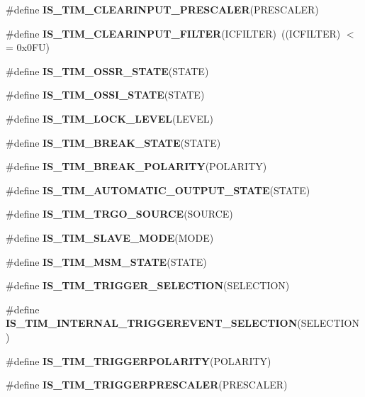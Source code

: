 \begin{DoxyCompactItemize}
\#define {\bfseries I\+S\+\_\+\+T\+I\+M\+\_\+\+C\+L\+E\+A\+R\+I\+N\+P\+U\+T\+\_\+\+P\+R\+E\+S\+C\+A\+L\+ER}(P\+R\+E\+S\+C\+A\+L\+ER)
\item 
\mbox{\label{group___t_i_m___i_s___t_i_m___definitions_gac46ddca5cf26c731771dc3bc3cb724e9}} 
\#define {\bfseries I\+S\+\_\+\+T\+I\+M\+\_\+\+C\+L\+E\+A\+R\+I\+N\+P\+U\+T\+\_\+\+F\+I\+L\+T\+ER}(I\+C\+F\+I\+L\+T\+ER)~((I\+C\+F\+I\+L\+T\+ER) $<$= 0x0\+F\+U)
\item 
\#define {\bfseries I\+S\+\_\+\+T\+I\+M\+\_\+\+O\+S\+S\+R\+\_\+\+S\+T\+A\+TE}(S\+T\+A\+TE)
\item 
\#define {\bfseries I\+S\+\_\+\+T\+I\+M\+\_\+\+O\+S\+S\+I\+\_\+\+S\+T\+A\+TE}(S\+T\+A\+TE)
\item 
\#define {\bfseries I\+S\+\_\+\+T\+I\+M\+\_\+\+L\+O\+C\+K\+\_\+\+L\+E\+V\+EL}(L\+E\+V\+EL)
\item 
\#define {\bfseries I\+S\+\_\+\+T\+I\+M\+\_\+\+B\+R\+E\+A\+K\+\_\+\+S\+T\+A\+TE}(S\+T\+A\+TE)
\item 
\#define {\bfseries I\+S\+\_\+\+T\+I\+M\+\_\+\+B\+R\+E\+A\+K\+\_\+\+P\+O\+L\+A\+R\+I\+TY}(P\+O\+L\+A\+R\+I\+TY)
\item 
\#define {\bfseries I\+S\+\_\+\+T\+I\+M\+\_\+\+A\+U\+T\+O\+M\+A\+T\+I\+C\+\_\+\+O\+U\+T\+P\+U\+T\+\_\+\+S\+T\+A\+TE}(S\+T\+A\+TE)
\item 
\#define {\bfseries I\+S\+\_\+\+T\+I\+M\+\_\+\+T\+R\+G\+O\+\_\+\+S\+O\+U\+R\+CE}(S\+O\+U\+R\+CE)
\item 
\#define {\bfseries I\+S\+\_\+\+T\+I\+M\+\_\+\+S\+L\+A\+V\+E\+\_\+\+M\+O\+DE}(M\+O\+DE)
\item 
\#define {\bfseries I\+S\+\_\+\+T\+I\+M\+\_\+\+M\+S\+M\+\_\+\+S\+T\+A\+TE}(S\+T\+A\+TE)
\item 
\#define {\bfseries I\+S\+\_\+\+T\+I\+M\+\_\+\+T\+R\+I\+G\+G\+E\+R\+\_\+\+S\+E\+L\+E\+C\+T\+I\+ON}(S\+E\+L\+E\+C\+T\+I\+ON)
\item 
\#define {\bfseries I\+S\+\_\+\+T\+I\+M\+\_\+\+I\+N\+T\+E\+R\+N\+A\+L\+\_\+\+T\+R\+I\+G\+G\+E\+R\+E\+V\+E\+N\+T\+\_\+\+S\+E\+L\+E\+C\+T\+I\+ON}(S\+E\+L\+E\+C\+T\+I\+ON)
\item 
\#define {\bfseries I\+S\+\_\+\+T\+I\+M\+\_\+\+T\+R\+I\+G\+G\+E\+R\+P\+O\+L\+A\+R\+I\+TY}(P\+O\+L\+A\+R\+I\+TY)
\item 
\#define {\bfseries I\+S\+\_\+\+T\+I\+M\+\_\+\+T\+R\+I\+G\+G\+E\+R\+P\+R\+E\+S\+C\+A\+L\+ER}(P\+R\+E\+S\+C\+A\+L\+ER)
\item 
\mbox{\label{group___t_i_m___i_s___t_i_m___definitions_gaa1f78b846d7c6c3d54dd35f2ecdabd2f}} 

\end{DoxyCompactItemize}
